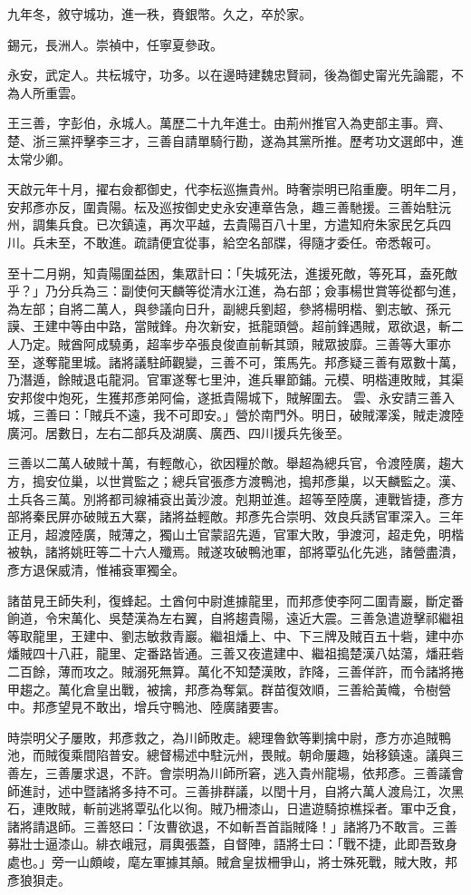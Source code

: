 \begin{pinyinscope}
{{九年冬，敘守城功，進一秩，賚銀幣。久之，卒於家。

錫元，長洲人。崇禎中，任寧夏參政。

永安，武定人。共枟城守，功多。以在邊時建魏忠賢祠，後為御史甯光先論罷，不為人所重雲。

王三善，字彭伯，永城人。萬歷二十九年進士。由荊州推官入為吏部主事。齊、楚、浙三黨抨擊李三才，三善自請單騎行勘，遂為其黨所推。歷考功文選郎中，進太常少卿。

天啟元年十月，擢右僉都御史，代李枟巡撫貴州。時奢崇明已陷重慶。明年二月，安邦彥亦反，圍貴陽。枟及巡按御史史永安連章告急，趣三善馳援。三善始駐沅州，調集兵食。已次鎮遠，再次平越，去貴陽百八十里，方遣知府朱家民乞兵四川。兵未至，不敢進。疏請便宜從事，給空名部牒，得隨才委任。帝悉報可。

至十二月朔，知貴陽圍益困，集眾計曰：「失城死法，進援死敵，等死耳，盍死敵乎？」乃分兵為三：副使何天麟等從清水江進，為右部；僉事楊世賞等從都勻進，為左部；自將二萬人，與參議向日升，副總兵劉超，參將楊明楷、劉志敏、孫元謨、王建中等由中路，當賊鋒。舟次新安，抵龍頭營。超前鋒遇賊，眾欲退，斬二人乃定。賊酋阿成驍勇，超率步卒張良俊直前斬其頭，賊眾披靡。三善等大軍亦至，遂奪龍里城。諸將議駐師觀變，三善不可，策馬先。邦彥疑三善有眾數十萬，乃潛遁，餘賊退屯龍洞。官軍遂奪七里沖，進兵畢節鋪。元模、明楷連敗賊，其渠安邦俊中炮死，生獲邦彥弟阿倫，遂抵貴陽城下，賊解圍去。雲、永安請三善入城，三善曰：「賊兵不遠，我不可即安。」營於南門外。明日，破賊澤溪，賊走渡陸廣河。居數日，左右二部兵及湖廣、廣西、四川援兵先後至。

三善以二萬人破賊十萬，有輕敵心，欲因糧於敵。舉超為總兵官，令渡陸廣，趨大方，搗安位巢，以世賞監之；總兵官張彥方渡鴨池，搗邦彥巢，以天麟監之。漢、土兵各三萬。別將都司線補袞出黃沙渡。剋期並進。超等至陸廣，連戰皆捷，彥方部將秦民屏亦破賊五大寨，諸將益輕敵。邦彥先合崇明、效良兵誘官軍深入。三年正月，超渡陸廣，賊薄之，獨山土官蒙詔先遁，官軍大敗，爭渡河，超走免，明楷被執，諸將姚旺等二十六人殲焉。賊遂攻破鴨池軍，部將覃弘化先逃，諸營盡潰，彥方退保威清，惟補袞軍獨全。

諸苗見王師失利，復蜂起。土酋何中尉進據龍里，而邦彥使李阿二圍青巖，斷定番餉道，令宋萬化、吳楚漢為左右翼，自將趨貴陽，遠近大震。三善急遣遊擊祁繼祖等取龍里，王建中、劉志敏救青巖。繼祖燔上、中、下三牌及賊百五十砦，建中亦燔賊四十八莊，龍里、定番路皆通。三善又夜遣建中、繼祖搗楚漢八姑蕩，燔莊砦二百餘，薄而攻之。賊溺死無算。萬化不知楚漢敗，詐降，三善佯許，而令諸將捲甲趨之。萬化倉皇出戰，被擒，邦彥為奪氣。群苗復效順，三善給黃幟，令樹營中。邦彥望見不敢出，增兵守鴨池、陸廣諸要害。

時崇明父子屢敗，邦彥救之，為川師敗走。總理魯欽等剿擒中尉，彥方亦追賊鴨池，而賊復乘間陷普安。總督楊述中駐沅州，畏賊。朝命屢趣，始移鎮遠。議與三善左，三善屢求退，不許。會崇明為川師所窘，逃入貴州龍場，依邦彥。三善議會師進討，述中暨諸將多持不可。三善排群議，以閏十月，自將六萬人渡烏江，次黑石，連敗賊，斬前逃將覃弘化以徇。賊乃柵漆山，日遣遊騎掠樵採者。軍中乏食，諸將請退師。三善怒曰：「汝曹欲退，不如斬吾首詣賊降！」諸將乃不敢言。三善募壯士逼漆山。緋衣峨冠，肩輿張蓋，自督陣，語將士曰：「戰不捷，此即吾致身處也。」旁一山頗峻，麾左軍據其顛。賊倉皇拔柵爭山，將士殊死戰，賊大敗，邦彥狼狽走。

}}
\end{pinyinscope}
